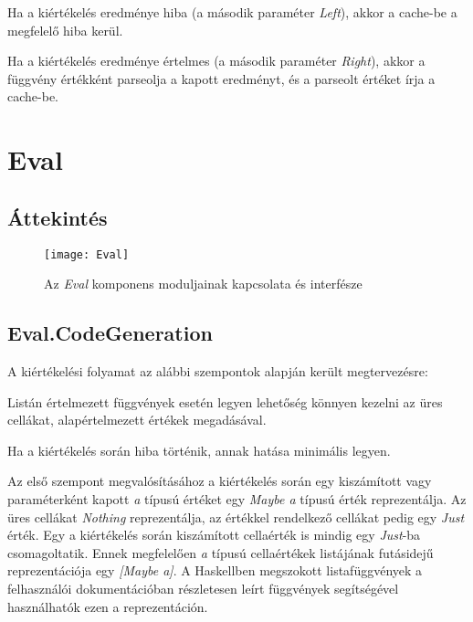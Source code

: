 \begin{compactenum}
	\item Ha a kiértékelés eredménye hiba (a második paraméter \textit{Left}), akkor a cache-be a megfelelő hiba kerül.
	\item Ha a kiértékelés eredménye értelmes (a második paraméter \textit{Right}), akkor a függvény értékként parseolja a kapott eredményt, és a parseolt értéket írja a cache-be.
\end{compactenum}

\section{Eval}

\subsection{Áttekintés}

\begin{figure}[H]
	\centering
	\texttt{[image: Eval]}
	\caption{Az \textit{Eval} komponens moduljainak kapcsolata és interfésze}
	\label{fig:appstructure}
\end{figure}

\subsection{Eval.CodeGeneration}

A kiértékelési folyamat az alábbi szempontok alapján került megtervezésre:
\begin{compactenum}
	\item Listán értelmezett függvények esetén legyen lehetőség könnyen kezelni az üres cellákat, alapértelmezett értékek megadásával.
	\item Ha a kiértékelés során hiba történik, annak hatása minimális legyen.
\end{compactenum}

Az első szempont megvalósításához a kiértékelés során egy kiszámított vagy paraméterként kapott \textit{a} típusú értéket egy \textit{Maybe a} típusú érték reprezentálja. Az üres cellákat \textit{Nothing} reprezentálja, az értékkel rendelkező cellákat pedig egy \textit{Just} érték. Egy a kiértékelés során kiszámított cellaérték is mindig egy \textit{Just}-ba csomagoltatik. Ennek megfelelően \textit{a} típusú cellaértékek listájának futásidejű reprezentációja egy \textit{[Maybe a]}. A Haskellben megszokott listafüggvények a felhasználói dokumentációban részletesen leírt függvények segítségével használhatók ezen a reprezentáción.

